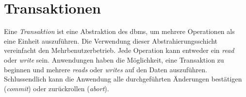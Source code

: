\section{Transaktionen}
Eine \textit{Transaktion} ist eine Abstraktion des \acrshort{dbms}, um mehrere Operationen als eine Einheit auszuführen. Die Verwendung dieser Abstrahierungsschicht vereinfacht den Mehrbenutzerbetrieb. Jede Operation kann entweder ein \textit{read} oder \textit{write} sein. Anwendungen haben die Möglichkeit, eine Transaktion zu beginnen und mehrere \textit{reads} oder \textit{writes} auf den Daten auszuführen. Schlussendlich kann die Anwendung alle durchgeführten Änderungen bestätigen (\textit{commit}) oder zurückrollen (\textit{abort})\cite{Dey.}.
